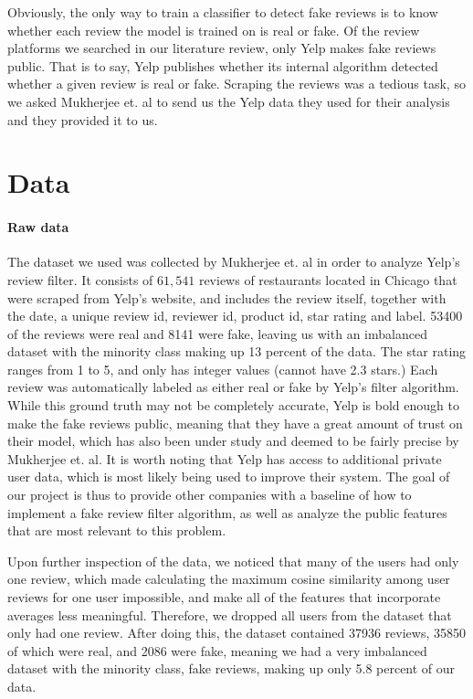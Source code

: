 \documentclass[man, floatsintext, 10pt]{apa6}
\begin{document}
Obviously, the only way to train a classifier to detect fake reviews is to know whether each review the model is trained on is real or fake. Of the review platforms we  searched in our literature review, only Yelp makes fake reviews public. That is to say, Yelp publishes whether its internal algorithm detected whether a given review is real or fake. Scraping the reviews was a tedious task, so we asked Mukherjee et. al to send us the Yelp data they used for their analysis and they provided it to us. 

\section{Data}

\paragraph{Raw data} The dataset we used was collected by Mukherjee et. al in order to analyze Yelp's review filter. It consists of  $61,541$ reviews of restaurants located in Chicago that were scraped from Yelp's website, and includes the review itself, together with the date, a unique review id, reviewer id, product id, star rating and label. 53400  of the reviews were real and  8141 were fake, leaving us with an imbalanced dataset with the minority class making up 13 percent of the data. The star rating ranges from 1 to 5, and only has integer values (cannot have 2.3 stars.)  Each review was automatically labeled as either real or fake by Yelp's filter algorithm. While this ground truth may not be completely accurate, Yelp is bold enough to make the fake reviews public, meaning that they have a great amount of trust on their model, which has also been under study and deemed to be fairly precise by Mukherjee et. al. It is worth noting that Yelp has access to additional private user data, which is most likely being used to improve their system. The goal of our project is thus to provide other companies with a baseline of how to implement a fake review filter algorithm, as well as analyze the public features that are most relevant to this problem. 

Upon further inspection of the data, we noticed that many of the users had only one review, which made calculating the maximum cosine similarity among user reviews for one user impossible, and make all of the features that incorporate averages less meaningful. Therefore, we dropped all users from the dataset that only had one review. After doing this, the dataset contained 37936 reviews, 35850 of which were real, and 2086 were fake, meaning we had a very imbalanced dataset with the minority class, fake reviews, making up only 5.8 percent of our data. 
\end{document}
